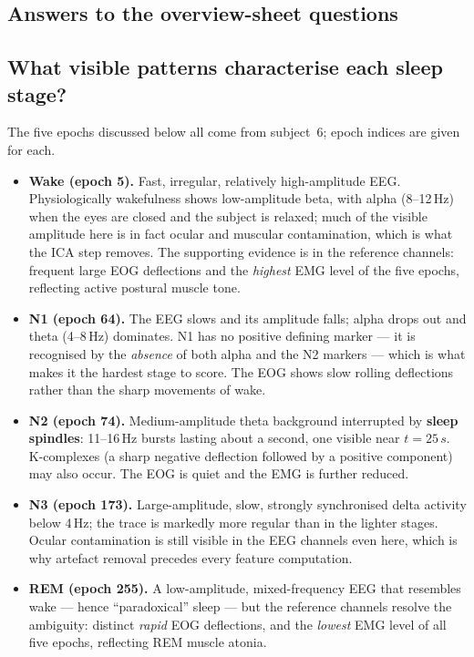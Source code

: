 \documentclass[11pt,a4paper]{article}
\newcommand{\hertz}{Hz}
\newcommand{\second}{s}
\newcommand{\SI}[2]{#1\,#2}
\newcommand{\SIrange}[3]{#1--#2\,#3}
\newcommand{\Q}[1]{\subsection*{#1}}
\begin{document}
\subsection{Answers to the overview-sheet questions}

\Q{What visible patterns characterise each sleep stage?}

The five epochs discussed below all come from subject~6; epoch indices are given for each.

\begin{itemize}
  \item \textbf{Wake (epoch 5).} Fast, irregular, relatively high-amplitude EEG. Physiologically
        wakefulness shows low-amplitude beta, with alpha (\SIrange{8}{12}{\hertz}) when the
        eyes are closed and the subject is relaxed; much of the visible amplitude here is in
        fact ocular and muscular contamination, which is what the ICA step removes. The
        supporting evidence is in the reference channels: frequent large EOG deflections and
        the \emph{highest} EMG level of the five epochs, reflecting active postural muscle tone.
  \item \textbf{N1 (epoch 64).} The EEG slows and its amplitude falls; alpha drops out and theta
        (\SIrange{4}{8}{\hertz}) dominates. N1 has no positive defining marker --- it is
        recognised by the \emph{absence} of both alpha and the N2 markers --- which is what makes
        it the hardest stage to score. The EOG shows slow rolling deflections rather than the
        sharp movements of wake.
  \item \textbf{N2 (epoch 74).} Medium-amplitude theta background interrupted by
        \textbf{sleep spindles}: \SIrange{11}{16}{\hertz} bursts lasting about a second, one
        visible near $t=\SI{25}{\second}$. K-complexes (a sharp negative deflection followed by
        a positive component) may also occur. The EOG is quiet and the EMG is further reduced.
  \item \textbf{N3 (epoch 173).} Large-amplitude, slow, strongly synchronised delta activity
        below \SI{4}{\hertz}; the trace is markedly more regular than in the lighter stages.
        Ocular contamination is still visible in the EEG channels even here, which is why
        artefact removal precedes every feature computation.
  \item \textbf{REM (epoch 255).} A low-amplitude, mixed-frequency EEG that resembles wake ---
        hence ``paradoxical'' sleep --- but the reference channels resolve the ambiguity:
        distinct \emph{rapid} EOG deflections, and the \emph{lowest} EMG level of all five
        epochs, reflecting REM muscle atonia.
\end{itemize}
\end{document}
